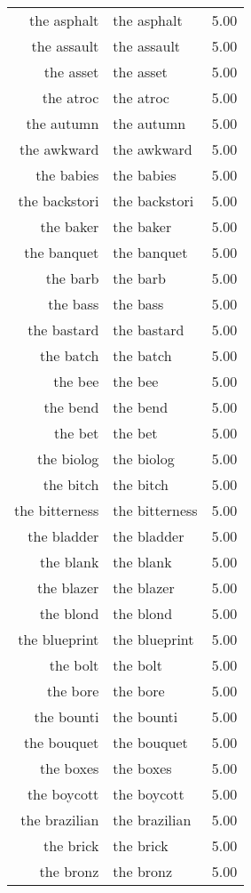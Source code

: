 \begin{table}[ht]
\begin{tabular}{rlr}
  the asphalt & the asphalt & 5.00 \\ 
  the assault & the assault & 5.00 \\ 
  the asset & the asset & 5.00 \\ 
  the atroc & the atroc & 5.00 \\ 
  the autumn & the autumn & 5.00 \\ 
  the awkward & the awkward & 5.00 \\ 
  the babies & the babies & 5.00 \\ 
  the backstori & the backstori & 5.00 \\ 
  the baker & the baker & 5.00 \\ 
  the banquet & the banquet & 5.00 \\ 
  the barb & the barb & 5.00 \\ 
  the bass & the bass & 5.00 \\ 
  the bastard & the bastard & 5.00 \\ 
  the batch & the batch & 5.00 \\ 
  the bee & the bee & 5.00 \\ 
  the bend & the bend & 5.00 \\ 
  the bet & the bet & 5.00 \\ 
  the biolog & the biolog & 5.00 \\ 
  the bitch & the bitch & 5.00 \\ 
  the bitterness & the bitterness & 5.00 \\ 
  the bladder & the bladder & 5.00 \\ 
  the blank & the blank & 5.00 \\ 
  the blazer & the blazer & 5.00 \\ 
  the blond & the blond & 5.00 \\ 
  the blueprint & the blueprint & 5.00 \\ 
  the bolt & the bolt & 5.00 \\ 
  the bore & the bore & 5.00 \\ 
  the bounti & the bounti & 5.00 \\ 
  the bouquet & the bouquet & 5.00 \\ 
  the boxes & the boxes & 5.00 \\ 
  the boycott & the boycott & 5.00 \\ 
  the brazilian & the brazilian & 5.00 \\ 
  the brick & the brick & 5.00 \\ 
  the bronz & the bronz & 5.00 \\ 

\end{tabular}
\end{table}
